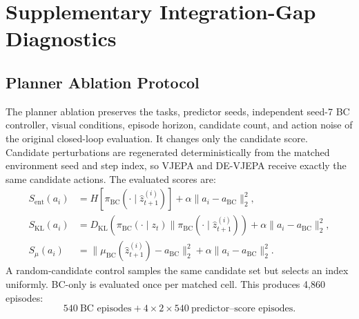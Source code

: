 \documentclass[10pt,twocolumn]{article}
\theoremstyle{tightstyle}
\begin{document}
\section{Supplementary Integration-Gap Diagnostics}
\label{app:integration-diagnostics}

\subsection{Planner Ablation Protocol}

The planner ablation preserves the tasks, predictor seeds, independent seed-7
BC controller, visual conditions, episode horizon, candidate count, and action
noise of the original closed-loop evaluation. It changes only the candidate
score. Candidate perturbations are regenerated deterministically from the
matched environment seed and step index, so VJEPA and DE-VJEPA receive exactly
the same candidate actions. The evaluated scores are:
\begin{align}
S_{\mathrm{ent}}(a_i)
&=
H[\pi_{\mathrm{BC}}(\cdot\mid\hat z_{t+1}^{(i)})]
+\alpha\|a_i-a_{\mathrm{BC}}\|_2^2,\\
S_{\mathrm{KL}}(a_i)
&=
D_{\mathrm{KL}}\!\left(
\pi_{\mathrm{BC}}(\cdot\mid z_t)\|
\pi_{\mathrm{BC}}(\cdot\mid\hat z_{t+1}^{(i)})
\right)
+\alpha\|a_i-a_{\mathrm{BC}}\|_2^2,\\
S_{\mu}(a_i)
&=
\|\mu_{\mathrm{BC}}(\hat z_{t+1}^{(i)})-a_{\mathrm{BC}}\|_2^2
+\alpha\|a_i-a_{\mathrm{BC}}\|_2^2.
\end{align}
A random-candidate control samples the same candidate set but selects an index
uniformly. BC-only is evaluated once per matched cell. This produces
4,860 episodes:
\[
540\ \text{BC episodes}
+4\times2\times540\ \text{predictor--score episodes}.
\]
\end{document}
